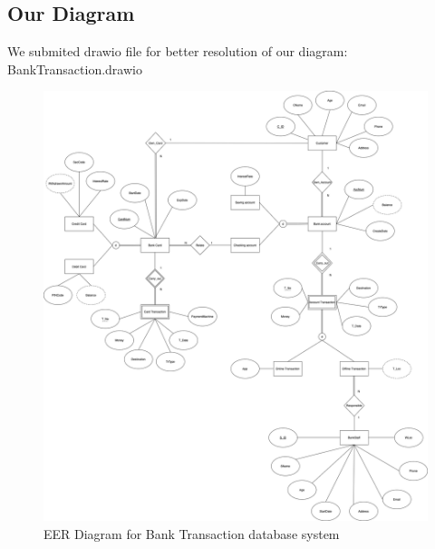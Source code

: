 \documentclass[12pt,a4paper]{article}
\begin{document}
\subsection{Our Diagram}
\indent We submited drawio file for better resolution of our diagram: BankTransaction.drawio
\begin{figure}[H]
      \centering
      \includegraphics[scale = 0.25]{Picture/BankTransaction.drawio.png}
      \caption{EER Diagram for Bank Transaction database system}
\end{figure}
\end{document}

